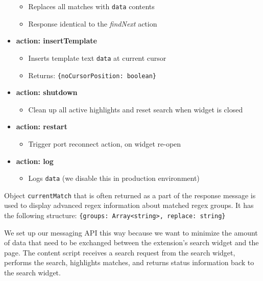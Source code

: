 \documentclass[bsc,frontabs,twoside,singlespacing,parskip,deptreport]{infthesis}
\providecommand{\tightlist}{%
  \setlength{\itemsep}{0pt}\setlength{\parskip}{0pt}}
\begin{document}
\begin{itemize}
\begin{itemize}
\tightlist
\item
  Replaces all matches with \texttt{data} contents
\item
  Response identical to the \textit{findNext} action
\end{itemize}

\item\textbf{action: insertTemplate}

\begin{itemize}
\tightlist
\item
  Inserts template text \texttt{data} at current cursor
\item
  Returns: \texttt{\{noCursorPosition:\ boolean\}}
\end{itemize}

\item\textbf{action: shutdown}

\begin{itemize}
\tightlist
\item
  Clean up all active highlights and reset search when widget is closed
\end{itemize}

\item\textbf{action: restart}

\begin{itemize}
\tightlist
\item
  Trigger port reconnect action, on widget re-open
\end{itemize}

\item\textbf{action: log}

\begin{itemize}
\tightlist
\item
  Logs \texttt{data} (we disable this in production environment) 
\end{itemize}
\end{itemize}

Object \texttt{currentMatch} that is often returned as a part of the response message is used to display advanced regex information about matched regex groups. It has the following structure:
\texttt{\{groups:\ Array\textless{}string\textgreater{},\ replace:\ string\}}

We set up our messaging API this way because we want to minimize the amount of data that need to be exchanged between the extension's search widget and the page. The content script receives a search request from the search widget, performs the search, highlights matches, and returns status information back to the search widget. 
\end{document}
